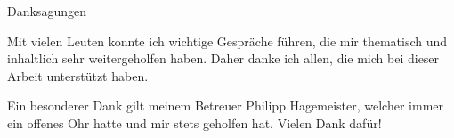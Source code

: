 \begin{center} 
	\huge Danksagungen
\end{center}
Mit vielen Leuten konnte ich wichtige Gespräche führen, die mir thematisch und inhaltlich sehr weitergeholfen haben. Daher danke ich allen, die mich bei dieser Arbeit unterstützt haben.\par

Ein besonderer Dank gilt meinem Betreuer Philipp Hagemeister, welcher immer ein offenes Ohr hatte und mir stets geholfen hat. Vielen Dank dafür!